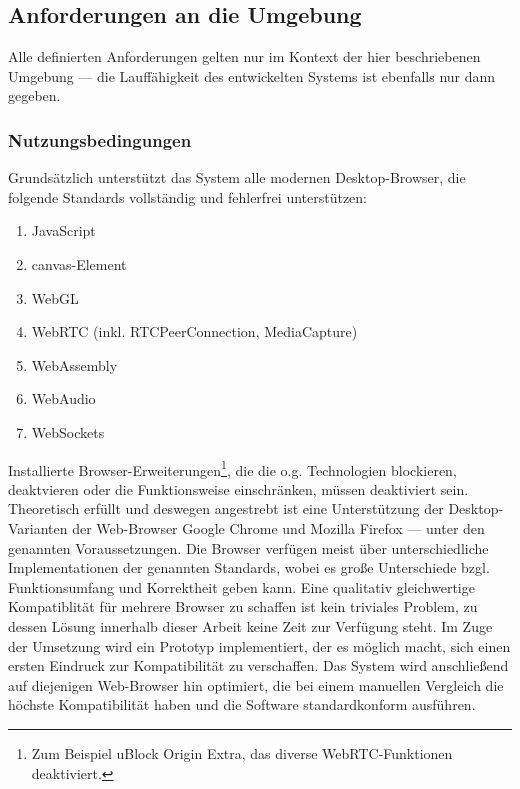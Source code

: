  

\subsection{Anforderungen an die
Umgebung}\label{anforderungen-an-die-umgebung}

Alle definierten Anforderungen gelten nur im Kontext der hier
beschriebenen Umgebung --- die Lauffähigkeit des entwickelten Systems
ist ebenfalls nur dann gegeben.

\subsubsection{Nutzungsbedingungen}\label{nutzungsbedingungen}

Grundsätzlich unterstützt das System alle modernen Desktop-Browser, die
folgende Standards vollständig und fehlerfrei unterstützen:

\begin{enumerate}
\def\labelenumi{\arabic{enumi}.}
\tightlist
\item
  JavaScript
\item
  \gls{canvas}-Element
\item
  WebGL
\item
  WebRTC (inkl. RTCPeerConnection, MediaCapture)
\item
  WebAssembly
\item
  WebAudio
\item
  WebSockets
\end{enumerate}


Installierte
Browser-Erweiterungen\footnote{Zum Beispiel \glqq{}uBlock Origin Extra\grqq{}, das diverse WebRTC-Funktionen deaktiviert.},
die die o.g. Technologien blockieren, deaktvieren oder die
Funktionsweise einschränken, müssen deaktiviert sein. Theoretisch
erfüllt und deswegen angestrebt ist eine Unterstützung der
Desktop-Varianten der Web-Browser Google Chrome und Mozilla Firefox
--- unter den genannten Voraussetzungen. Die Browser verfügen meist über
unterschiedliche Implementationen der genannten Standards, wobei es
große Unterschiede bzgl. Funktionsumfang und Korrektheit geben kann.
Eine qualitativ gleichwertige Kompatiblität für mehrere Browser zu
schaffen ist kein triviales Problem, zu dessen Lösung innerhalb dieser
Arbeit keine Zeit zur Verfügung steht. Im Zuge der Umsetzung wird ein
Prototyp implementiert, der es möglich macht, sich einen ersten Eindruck
zur Kompatibilität zu verschaffen. Das System wird anschließend auf
diejenigen Web-Browser hin optimiert, die bei einem manuellen Vergleich
die höchste Kompatibilität haben und die Software standardkonform
ausführen.

